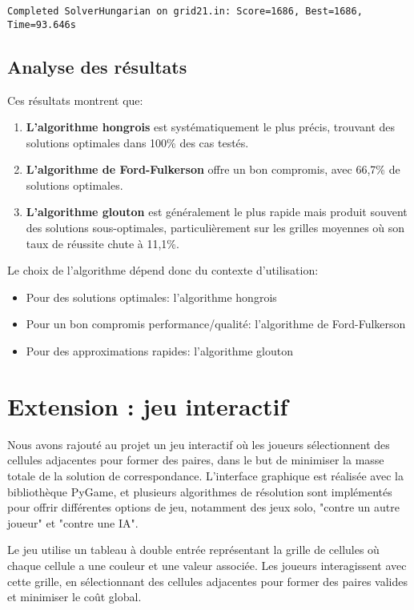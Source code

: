\documentclass[11pt, a4paper]{article}
\begin{document}
\begin{lstlisting}[caption=Resultat sur une grande grille]
Completed SolverHungarian on grid21.in: Score=1686, Best=1686, Time=93.646s
\end{lstlisting}

\subsection{Analyse des résultats}

Ces résultats montrent que:
\begin{enumerate}
    \item \textbf{L'algorithme hongrois} est systématiquement le plus précis, trouvant des solutions optimales dans 100\% des cas testés.
    \item \textbf{L'algorithme de Ford-Fulkerson} offre un bon compromis, avec 66,7\% de solutions optimales.
    \item \textbf{L'algorithme glouton} est généralement le plus rapide mais produit souvent des solutions sous-optimales, particulièrement sur les grilles moyennes où son taux de réussite chute à 11,1\%.
\end{enumerate}

Le choix de l'algorithme dépend donc du contexte d'utilisation:
\begin{itemize}
    \item Pour des solutions optimales: l'algorithme hongrois
    \item Pour un bon compromis performance/qualité: l'algorithme de Ford-Fulkerson
    \item Pour des approximations rapides: l'algorithme glouton
\end{itemize}

\section{Extension : jeu interactif}
\label{sec:jeu}

Nous avons rajouté au projet un jeu interactif où les joueurs sélectionnent des cellules adjacentes pour former des paires, dans le but de minimiser la masse totale de la solution de correspondance. L'interface graphique est réalisée avec la bibliothèque PyGame, et plusieurs algorithmes de résolution sont implémentés pour offrir différentes options de jeu, notamment des jeux solo, "contre un autre joueur" et "contre une IA".

Le jeu utilise un tableau à double entrée représentant la grille de cellules où chaque cellule a une couleur et une valeur associée. Les joueurs interagissent avec cette grille, en sélectionnant des cellules adjacentes pour former des paires valides et minimiser le coût global.
\end{document}
